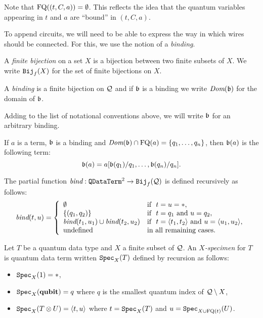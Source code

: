 \documentclass[twoside]{article}
\begin{document}
Note that $\mathop{\textrm{FQ}}\nolimits((t,C,a))=\emptyset$. This reflects the idea that the 
quantum variables appearing in $t$ and $a$ are ``bound'' in $(t,C,a)$. 

To append circuits, we will need to be able to express the way in 
which wires should be connected. For this, we use the notion of a 
\emph{binding}.

\begin{definition}
A \emph{finite bijection} on a set $X$ is a bijection between two 
finite subsets of $X$. We write $\texttt{Bij}_f(X)$ for the set of finite 
bijections on $X$.
\end{definition}

\begin{definition}
A \emph{binding} is a finite bijection on $\mathcal{Q}$ and if $\mathfrak{b}$ 
is a binding we write $\mathop{\textit{Dom}}\nolimits(\mathfrak{b})$ for the domain of $\mathfrak{b}$.
\end{definition}

Adding to the list of notational conventions above, we will write 
$\mathfrak{b}$ for an arbitrary binding. 

\begin{definition}
If $a$ is a term, $\mathfrak{b}$ is a binding and $\mathop{\textit{Dom}}\nolimits(\mathfrak{b})\cap
\mathop{\textrm{FQ}}\nolimits(a)=\{q_1,\ldots,q_n\}$, then $\mathfrak{b}(a)$ is the following 
term:
\[
\mathfrak{b}(a)= a[\mathfrak{b}(q_1)/q_1,\ldots ,\mathfrak{b}(q_n)/q_n].
\]
\end{definition}

\begin{definition}
The partial function $\mathop{\textit{bind}}\nolimits: \texttt{QDataTerm}^2\to \texttt{Bij}_f(\mathcal{Q})$ is 
defined recursively as follows:
\[
\mathop{\textit{bind}}\nolimits (t,u)= \left\{
  \begin{array}{ll}
    \emptyset & \mbox{if}~~ t=u=*, \\
    \{(q_1,q_2)\} & \mbox{if}~~ t=q_1 \mbox{ and } u=q_2, \\        
    \mathop{\textit{bind}}\nolimits (t_1,u_1) \cup \mathop{\textit{bind}}\nolimits (t_2,u_2) & 
      \mbox{if}~~ t=\langle t_1,t_2\rangle \mbox{ and } u=\langle u_1,u_2\rangle, \\
    \mbox{undefined} & \mbox{in all remaining cases.}
  \end{array}
\right.
\]
\end{definition}

\begin{definition}
Let $T$ be a quantum data type and $X$ a finite subset of $\mathcal{Q}$. 
An \emph{$X$-specimen} for $T$ is quantum data term written $\texttt{Spec}_X(T)$ 
defined by recursion as follows:
\begin{itemize}
  \item $\texttt{Spec}_X(1)=*$,
  \item $\texttt{Spec}_X(\textrm{\bf qubit})=q$ where $q$ is the smallest quantum 
  index of $\mathcal{Q}\setminus X$,
  \item $\texttt{Spec}_X(T\otimes U)=\langle t,u\rangle$ where $t=\texttt{Spec}_X(T)$ 
  and $u=\texttt{Spec}_{X\cup \mathop{\textrm{FQ}}\nolimits(t)}(U)$.  
\end{itemize}
\end{definition}
\end{document}
